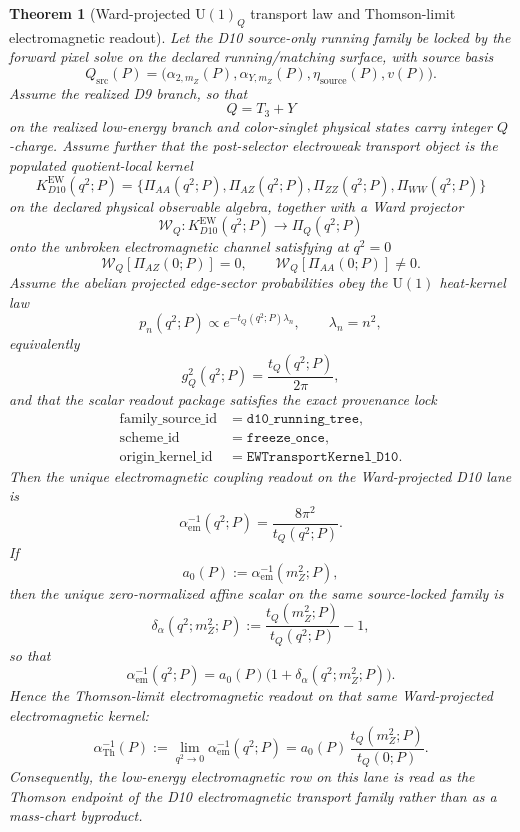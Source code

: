\documentclass[11pt]{article}
\newtheorem{theorem}{Theorem}[section]
\newcommand{\U}{\mathrm{U}}
\begin{document}
\begin{theorem}[Ward-projected \texorpdfstring{\(\U(1)_Q\)}{U(1)_Q} transport law and Thomson-limit electromagnetic readout]\label{thm:ward_u1q_transport}
Let the D10 source-only running family be locked by the forward pixel solve on the declared
running/matching surface, with source basis
\[
Q_{\mathrm{src}}(P)=
\bigl(\alpha_{2,m_Z}(P),\alpha_{Y,m_Z}(P),\eta_{\mathrm{source}}(P),v(P)\bigr).
\]
Assume the realized D9 branch, so that
\[
Q=T_3+Y
\]
on the realized low-energy branch and color-singlet physical states carry integer \(Q\)-charge.
Assume further that the post-selector electroweak transport object is the populated quotient-local
kernel
\[
K^{\mathrm{EW}}_{D10}(q^2;P)
=
\bigl\{\Pi_{AA}(q^2;P),\Pi_{AZ}(q^2;P),\Pi_{ZZ}(q^2;P),\Pi_{WW}(q^2;P)\bigr\}
\]
on the declared physical observable algebra, together with a Ward projector
\[
\mathcal W_Q:
K^{\mathrm{EW}}_{D10}(q^2;P)\longrightarrow \Pi_Q(q^2;P)
\]
onto the unbroken electromagnetic channel satisfying at \(q^2=0\)
\[
\mathcal W_Q[\Pi_{AZ}(0;P)]=0,
\qquad
\mathcal W_Q[\Pi_{AA}(0;P)]\neq 0.
\]
Assume the abelian projected edge-sector probabilities obey the \(\U(1)\) heat-kernel law
\[
p_n(q^2;P)\propto e^{-t_Q(q^2;P)\lambda_n},
\qquad
\lambda_n=n^2,
\]
equivalently
\[
g_Q^2(q^2;P)=\frac{t_Q(q^2;P)}{2\pi},
\]
and that the scalar readout package satisfies the exact provenance lock
\[
\begin{aligned}
\text{family\_source\_id} &= \texttt{d10\_running\_tree},\\
\text{scheme\_id} &= \texttt{freeze\_once},\\
\text{origin\_kernel\_id} &= \texttt{EWTransportKernel\_D10}.
\end{aligned}
\]
Then the unique electromagnetic coupling readout on the Ward-projected D10 lane is
\[
\alpha_{\mathrm{em}}^{-1}(q^2;P)=\frac{8\pi^2}{t_Q(q^2;P)}.
\]
If
\[
a_0(P):=\alpha_{\mathrm{em}}^{-1}(m_Z^2;P),
\]
then the unique zero-normalized affine scalar on the same source-locked family is
\[
\delta_\alpha(q^2;m_Z^2;P)
:=
\frac{t_Q(m_Z^2;P)}{t_Q(q^2;P)}-1,
\]
so that
\[
\alpha_{\mathrm{em}}^{-1}(q^2;P)
=
a_0(P)\bigl(1+\delta_\alpha(q^2;m_Z^2;P)\bigr).
\]
Hence the Thomson-limit electromagnetic readout on that same
Ward-projected electromagnetic kernel:
\[
\alpha_{\mathrm{Th}}^{-1}(P)
:=
\lim_{q^2\to0}\alpha_{\mathrm{em}}^{-1}(q^2;P)
=
a_0(P)\,\frac{t_Q(m_Z^2;P)}{t_Q(0;P)}.
\]
Consequently, the low-energy electromagnetic row on this lane is read as the Thomson endpoint of
the D10 electromagnetic transport family rather than as a mass-chart byproduct.
\end{theorem}
\end{document}
